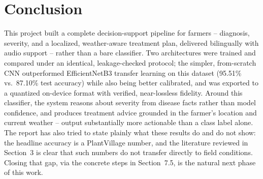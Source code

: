 \documentclass[12pt,a4paper]{article}
\begin{document}
\section{Conclusion}
This project built a complete decision-support pipeline for farmers --
diagnosis, severity, and a localized, weather-aware treatment plan, delivered
bilingually with audio support -- rather than a bare classifier. Two
architectures were trained and compared under an identical, leakage-checked
protocol; the simpler, from-scratch CNN outperformed EfficientNetB3 transfer
learning on this dataset (95.51\% vs.\ 87.10\% test accuracy) while also
being better calibrated, and was exported to a quantized on-device format
with verified, near-lossless fidelity. Around this classifier, the system
reasons about severity from disease facts rather than model confidence, and
produces treatment advice grounded in the farmer's location and current
weather -- output substantially more actionable than a class label alone.
The report has also tried to state plainly what these results do and do not
show: the headline accuracy is a PlantVillage number, and the literature
reviewed in Section~3 is clear that such numbers do not transfer directly to
field conditions. Closing that gap, via the concrete steps in Section~7.5, is
the natural next phase of this work.

\end{document}
